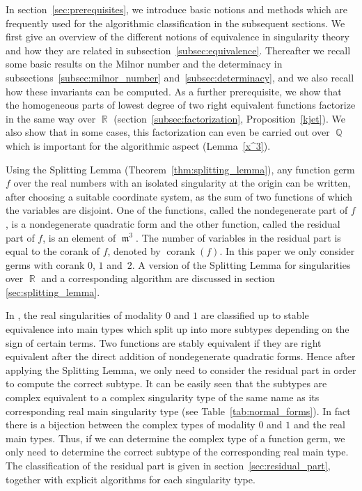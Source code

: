 \documentclass[noend]{amsproc}
\theoremstyle{definition}
\DeclareMathOperator{\m}{\mathfrak{m}}
\DeclareMathOperator{\corank}{corank}
\DeclareMathOperator{\Q}{\mathbb{Q}}
\DeclareMathOperator{\R}{\mathbb{R}}
\begin{document}
In section~\ref{sec:prerequisites}, we introduce basic notions and methods
which are frequently used for the algorithmic classification in the subsequent
sections. We first give an overview of the different notions of equivalence in
singularity theory and how they are related in
subsection~\ref{subsec:equivalence}. Thereafter we recall some basic results on
the Milnor number and the determinacy in subsections~\ref{subsec:milnor_number}
and~\ref{subsec:determinacy}, and we also recall how these invariants can be
computed. As a further prerequisite, we show that the homogeneous parts of
lowest degree of two right equivalent functions factorize in the same way over
$\R$ (section~\ref{subsec:factorization}, Proposition~\ref{kjet}). We also show
that in some cases, this factorization can even be carried out over $\Q$ which
is important for the algorithmic aspect (Lemma~\ref{x^3}).

Using the Splitting Lemma (Theorem~\ref{thm:splitting_lemma}), any function
germ $f$ over the real numbers with an isolated singularity at the origin can
be written, after choosing a suitable coordinate system, as the sum of two
functions of which the variables are disjoint. One of the functions, called the
nondegenerate part of $f$, is a nondegenerate quadratic form and the other
function, called the residual part of $f$, is an element of $\m^3$. The number
of variables in the residual part is equal to the corank of $f$, denoted by
$\corank(f)$. In this paper we only consider germs with corank $0$, $1$
and~$2$. A version of the Splitting Lemma for singularities over $\R$ and a
corresponding algorithm are discussed in section \ref{sec:splitting_lemma}.

In \citet{AVG1985}, the real singularities of modality $0$ and $1$ are
classified up to stable equivalence into main types which split up into more
subtypes
depending on the sign of certain terms. Two functions are stably equivalent if
they are right equivalent after the direct addition of nondegenerate quadratic
forms. Hence after applying the Splitting Lemma, we only need to consider the
residual part in order to compute the correct subtype. It can be easily seen
that the subtypes are complex equivalent to a complex singularity type of the
same name as its corresponding real main singularity type (see
Table~\ref{tab:normal_forms}). In fact there is a bijection between the complex
types of modality $0$ and $1$ and the real main types. Thus, if we can
determine the complex type of a function germ, we only need to determine the
correct subtype of the corresponding real main type. The classification of the
residual part is given in section~\ref{sec:residual_part}, together with
explicit algorithms for each singularity type.
\end{document}
